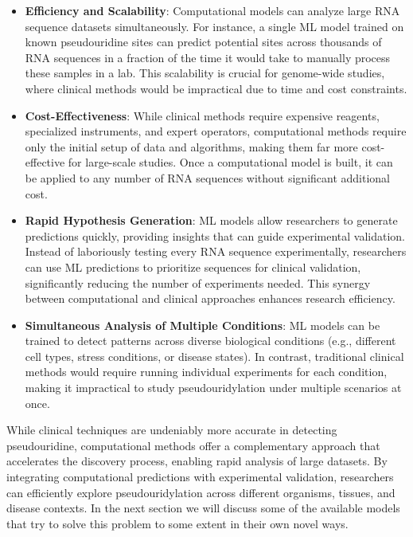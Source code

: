     \begin{itemize}
      \item \textbf{Efficiency and Scalability}: Computational models can analyze large RNA sequence datasets simultaneously. For instance, a single ML model trained on known pseudouridine sites can predict potential sites across thousands of RNA sequences in a fraction of the time it would take to manually process these samples in a lab. This scalability is crucial for genome-wide studies, where clinical methods would be impractical due to time and cost constraints.
      \item \textbf{Cost-Effectiveness}: While clinical methods require expensive reagents, specialized instruments, and expert operators, computational methods require only the initial setup of data and algorithms, making them far more cost-effective for large-scale studies. Once a computational model is built, it can be applied to any number of RNA sequences without significant additional cost.
      \item \textbf{Rapid Hypothesis Generation}: ML models allow researchers to generate predictions quickly, providing insights that can guide experimental validation. Instead of laboriously testing every RNA sequence experimentally, researchers can use ML predictions to prioritize sequences for clinical validation, significantly reducing the number of experiments needed. This synergy between computational and clinical approaches enhances research efficiency.
      \item \textbf{Simultaneous Analysis of Multiple Conditions}: ML models can be trained to detect patterns across diverse biological conditions (e.g., different cell types, stress conditions, or disease states). In contrast, traditional clinical methods would require running individual experiments for each condition, making it impractical to study pseudouridylation under multiple scenarios at once.
    \end{itemize}

    While clinical techniques are undeniably more accurate in detecting pseudouridine, computational methods offer a complementary approach that accelerates the discovery process, enabling rapid analysis of large datasets. By integrating computational predictions with experimental validation, researchers can efficiently explore pseudouridylation across different organisms, tissues, and disease contexts. In the next section we will discuss some of the available models that try to solve this problem to some extent in their own novel ways.
